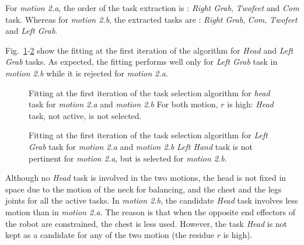 \documentclass[journal]{IEEEtran}
\begin{document}
For \emph{motion 2.a}, the order of the task extraction is :
\emph{Right Grab}, \emph{Twofeet} and \emph{Com} task.
Whereas for \emph{motion 2.b},
the extracted tasks are : \emph{Right Grab},  \emph{Com}, \emph{Twofeet} and \emph{Left Grab}.

Fig.~\ref{fig:exp1:headFit}-\ref{fig:exp1:taskLhand} show the
fitting at the first iteration of the algorithm for \emph{Head} and \emph{Left Grab} tasks. As expected,
the fitting performs well only for \emph{Left Grab} task in \emph{motion 2.b} while it is rejected for
\emph{motion 2.a}.
\begin{figure}[t]
  \centering
  \subfigure[Motion 2.a]{
  \resizebox{.48\textwidth}{!} {
  
  }
  \label{fig:exp1:headFit:R}
  }
  \subfigure[Motion 2.b]{
  \resizebox{.48\textwidth}{!} {
  
  }
  \label{fig:exp1:headFit:RL}
  }
  \caption{Fitting at the first iteration of the task selection algorithm
  for \emph{head} task for \emph{motion 2.a} and \emph{motion 2.b} 
  For both motion, $r$ is high: \emph{Head} task, not active, is not selected.}
  \label{fig:exp1:headFit}
\end{figure}
\begin{figure}[t]
  \centering
  \subfigure[Motion 2.a]{
  \resizebox{.48\textwidth}{!} {
  
  }                           
  \label{fig:exp1:taskLhand:R}
  }
  \subfigure[Motion 2.b]{
  \resizebox{.48\textwidth}{!} {
  
  }
  \label{fig:exp1:taskLhand:RL}
  }
  \caption{Fitting at the first iteration of the task selection algorithm
  for \emph{Left Grab} task for \emph{motion 2.a} and \emph{motion 2.b} 
  \emph{Left Hand} task is not pertinent for \emph{motion 2.a}, but is selected for \emph{motion 2.b}.}
  \label{fig:exp1:taskLhand}
\end{figure}

Although no \emph{Head} task is involved in the two motions, the head is not 
fixed in space due to the motion of the neck for balancing, and the chest and the legs
joints for all the active tasks.
In \emph{motion 2.b}, the candidate \emph{Head} task involves less motion
than in \emph{motion 2.a}. The reason is that when the opposite end effectors
of the robot are constrained, the chest is less used.
However, the task \emph{Head} is not kept as a candidate for any of the two motion (the residue $r$ is high).
\end{document}
